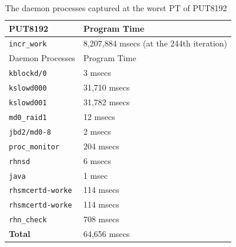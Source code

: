 \documentclass[10pt]{article}
\begin{document}
\begin{table}[H]
\centering
{
 \begin{tabular}{|l|l|} \hline
PUT8192 & Program Time \\ \hline
{\tt incr\_work} & 8,207,884 msecs (at the 244th iteration)\\ \hline \hline
Daemon Processes  & Program Time \\ \hline
{\tt kblockd/0} & 3 msecs\\ \hline
{\tt kslowd000} & 31,710 msecs\\ \hline
{\tt kslowd001} & 31,782 msecs\\ \hline
{\tt md0\_raid1} & 12 msecs\\ \hline
{\tt jbd2/md0-8} & 2 msecs\\ \hline
{\tt proc\_monitor} & 204 msecs\\ \hline
{\tt rhnsd} & 6 msecs\\ \hline
{\tt java} & 1 msec\\ \hline
{\tt rhsmcertd-worke} & 114 msecs\\ \hline
{\tt rhsmcertd-worke} & 114 msecs\\ \hline
{\tt rhn\_check} & 708 msecs\\ \hline \hline
{\bf Total} & 64,656 msecs\\ \hline
  \end{tabular}
  }
 \caption{The daemon processes captured at the worst PT of PUT8192~\label{fig:put8192_daemon}}
\end{table}
\end{document}
